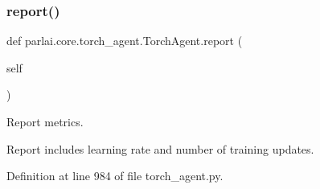 \mbox{\label{classparlai_1_1core_1_1torch__agent_1_1TorchAgent_ac694770cd4022eb047bf6fbb8f46035c}} 
\subsubsection{\texorpdfstring{report()}{report()}}
{\footnotesize\ttfamily def parlai.\+core.\+torch\+\_\+agent.\+Torch\+Agent.\+report (\begin{DoxyParamCaption}\item[{}]{self }\end{DoxyParamCaption})}

\begin{DoxyVerb}Report metrics.

Report includes learning rate and number of training updates.
\end{DoxyVerb}
 

Definition at line 984 of file torch\+\_\+agent.\+py.


